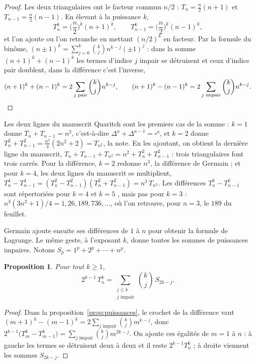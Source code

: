 \documentclass[11pt,a4paper]{article}
\newtheorem{proposition}{Proposition}
\theoremstyle{remark}
\begin{document}
\begin{proof}
Les deux triangulaires ont le facteur commun $n/2$ :
$T_n = \frac{n}{2}(n+1)$ et $T_{n-1} = \frac{n}{2}(n-1)$. En élevant à la
puissance $k$,
\[
T_n^k = \Big(\frac{n}{2}\Big)^{k} (n+1)^k,
\qquad
T_{n-1}^k = \Big(\frac{n}{2}\Big)^{k} (n-1)^k,
\]
et l'on ajoute ou l'on retranche en mettant $(n/2)^k$ en facteur. Par la
formule du binôme,
$(n \pm 1)^k = \sum_{j=0}^{k} \binom{k}{j} n^{k-j} (\pm 1)^j$ : dans la
somme $(n+1)^k + (n-1)^k$ les termes d'indice $j$ impair se détruisent et ceux
d'indice pair doublent, dans la différence c'est l'inverse,
\[
(n+1)^k + (n-1)^k = 2\sum_{j \text{ pair}} \binom{k}{j} n^{k-j},
\qquad
(n+1)^k - (n-1)^k = 2\sum_{j \text{ impair}} \binom{k}{j} n^{k-j}. \qedhere
\]
\end{proof}

Les deux lignes du manuscrit Quaritch sont les premiers cas de la somme :
$k = 1$ donne $T_n + T_{n-1} = n^2$, c'est-à-dire
$\Delta^a + \Delta^{a-1} = \square^a$, et $k = 2$ donne
$T_n^2 + T_{n-1}^2 = \frac{n^2}{4}(2n^2 + 2) = T_{n^2}$, la note. En les
ajoutant, on obtient la dernière ligne du manuscrit,
$T_n + T_{n-1} + T_{n^2} = n^2 + T_n^2 + T_{n-1}^2$ : trois triangulaires
font trois carrés. Pour la différence, $k = 2$ redonne $n^3$, la
différence de Germain ; et pour $k = 4$, les deux lignes du manuscrit se
multiplient,
$T_n^4 - T_{n-1}^4 = (T_n^2 - T_{n-1}^2)(T_n^2 + T_{n-1}^2) = n^3\,T_{n^2}$.
Les différences $T_n^k - T_{n-1}^k$ sont répertoriées pour $k = 4$ et
$k = 5$ \cite[A168364, A393642]{oeis}, mais pas pour $k = 3$ :
$n^3(3n^2+1)/4 = 1, 26, 189, 736, \dots$, où l'on retrouve, pour $n = 3$, le
$189$ du feuillet.

Germain ajoute ensuite ses différences de $1$ à $n$ pour obtenir la formule
de Lagrange. Le même geste, à l'exposant $k$, donne toutes les sommes de
puissances impaires. Notons $S_p = 1^p + 2^p + \cdots + n^p$.

\begin{proposition}\label{prop:sommes}
Pour tout $k \geq 1$,
\[
2^{k-1}\,T_n^k = \sum_{\substack{j \leq k\\ j \text{ impair}}} \binom{k}{j}\,S_{2k-j}.
\]
\end{proposition}

\begin{proof}
Dans la proposition~\ref{prop:puissances}, le crochet de la différence vaut
$(m+1)^k - (m-1)^k = 2\sum_{j \text{ impair}} \binom{k}{j} m^{k-j}$, donc
$2^{k-1}\big(T_m^k - T_{m-1}^k\big) = \sum_{j \text{ impair}} \binom{k}{j}
m^{2k-j}$. On ajoute ces égalités de $m = 1$ à $n$ : à gauche les termes se
détruisent deux à deux et il reste $2^{k-1} T_n^k$ ; à droite viennent les
sommes $S_{2k-j}$.
\end{proof}
\end{document}
